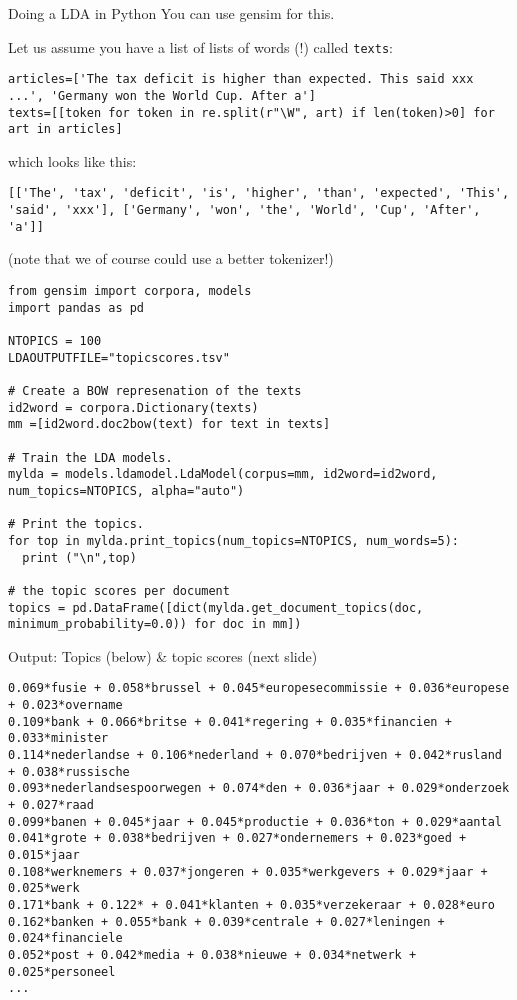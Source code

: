 \begin{frame}[fragile]{Doing a LDA in Python}
You can use gensim \cite{Rehurek2010} for this.

Let us assume you have a list of lists of words (!) called \texttt{texts}:

\begin{lstlisting}
articles=['The tax deficit is higher than expected. This said xxx ...', 'Germany won the World Cup. After a']
texts=[[token for token in re.split(r"\W", art) if len(token)>0] for art in articles]
\end{lstlisting}
which looks like this:
\begin{lstlisting}
[['The', 'tax', 'deficit', 'is', 'higher', 'than', 'expected', 'This', 'said', 'xxx'], ['Germany', 'won', 'the', 'World', 'Cup', 'After', 'a']]
\end{lstlisting}
(note that we of course could use a better tokenizer!)
\end{frame}




\begin{frame}
\begin{lstlisting}
from gensim import corpora, models
import pandas as pd

NTOPICS = 100
LDAOUTPUTFILE="topicscores.tsv"

# Create a BOW represenation of the texts
id2word = corpora.Dictionary(texts)
mm =[id2word.doc2bow(text) for text in texts]

# Train the LDA models.
mylda = models.ldamodel.LdaModel(corpus=mm, id2word=id2word, num_topics=NTOPICS, alpha="auto")

# Print the topics.
for top in mylda.print_topics(num_topics=NTOPICS, num_words=5):
  print ("\n",top)

# the topic scores per document
topics = pd.DataFrame([dict(mylda.get_document_topics(doc, minimum_probability=0.0)) for doc in mm])

\end{lstlisting}
\end{frame}


\begin{frame}[fragile]{Output: Topics (below) \& topic scores (next slide)}
\begin{lstlisting}
0.069*fusie + 0.058*brussel + 0.045*europesecommissie + 0.036*europese + 0.023*overname
0.109*bank + 0.066*britse + 0.041*regering + 0.035*financien + 0.033*minister
0.114*nederlandse + 0.106*nederland + 0.070*bedrijven + 0.042*rusland + 0.038*russische
0.093*nederlandsespoorwegen + 0.074*den + 0.036*jaar + 0.029*onderzoek + 0.027*raad
0.099*banen + 0.045*jaar + 0.045*productie + 0.036*ton + 0.029*aantal
0.041*grote + 0.038*bedrijven + 0.027*ondernemers + 0.023*goed + 0.015*jaar
0.108*werknemers + 0.037*jongeren + 0.035*werkgevers + 0.029*jaar + 0.025*werk
0.171*bank + 0.122* + 0.041*klanten + 0.035*verzekeraar + 0.028*euro
0.162*banken + 0.055*bank + 0.039*centrale + 0.027*leningen + 0.024*financiele
0.052*post + 0.042*media + 0.038*nieuwe + 0.034*netwerk + 0.025*personeel
...
\end{lstlisting}
\end{frame}


